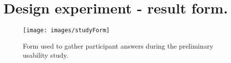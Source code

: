 \chapter{Design experiment - result form.}
\label{app:studyForm}

\begin{figure}[htb]
  \centering
    \texttt{[image: images/studyForm]}
  \caption{Form used to gather participant answers during the preliminary usability study.}
  \label{studyScreenshot}
\end{figure}
